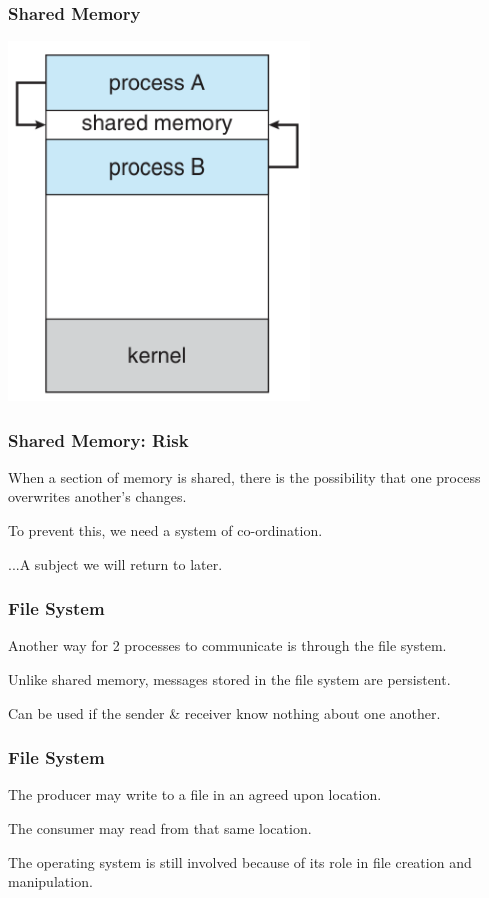 \begin{frame}
\frametitle{Shared Memory}

\begin{center}
	\includegraphics[width=0.6\textwidth]{images/shared-memory.png}
\end{center}

\end{frame}

\begin{frame}
\frametitle{Shared Memory: Risk}

When a section of memory is shared, there is the possibility that one process overwrites another's changes.

To prevent this, we need a system of co-ordination.

...A subject we will return to later.

\end{frame}

\begin{frame}
\frametitle{File System}

Another way for 2 processes to communicate is through the file system.

Unlike shared memory, messages stored in the file system are persistent. 

Can be used if the sender \& receiver know nothing about one another.

\end{frame}

\begin{frame}
\frametitle{File System}

The producer may write to a file in an agreed upon location.

The consumer may read from that same location.

The operating system is still involved because of its role in file creation and manipulation.

\end{frame}

